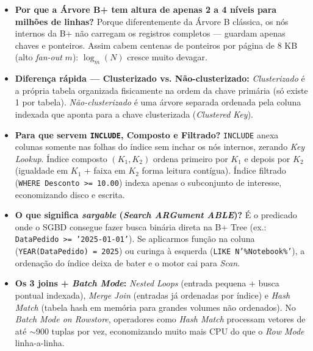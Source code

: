 \documentclass[10pt,a4paper]{article}
\begin{document}
\begin{expBox}
  \begin{itemize}[leftmargin=14pt,itemsep=2pt,topsep=1pt]
    \item \textbf{Por que a Árvore B+ tem altura de apenas 2 a 4 níveis para milhões de linhas?} Porque diferentemente da Árvore B clássica, os nós internos da B+ não carregam os registros completos — guardam apenas chaves e ponteiros. Assim cabem centenas de ponteiros por página de 8 KB (alto \emph{fan-out} $m$): $\log_m(N)$ cresce muito devagar.
    \item \textbf{Diferença rápida — Clusterizado vs. Não-clusterizado:}
      \emph{Clusterizado} é a própria tabela organizada fisicamente na ordem da chave primária (só existe 1 por tabela). \emph{Não-clusterizado} é uma árvore separada ordenada pela coluna indexada que aponta para a chave clusterizada (\emph{Clustered Key}).
    \item \textbf{Para que servem \texttt{INCLUDE}, Composto e Filtrado?}
      \texttt{INCLUDE} anexa colunas somente nas folhas do índice sem inchar os nós internos, zerando \emph{Key Lookup}. Índice composto $(K_1, K_2)$ ordena primeiro por $K_1$ e depois por $K_2$ (igualdade em $K_1$ + faixa em $K_2$ forma leitura contígua). Índice filtrado (\texttt{WHERE Desconto >= 10.00}) indexa apenas o subconjunto de interesse, economizando disco e escrita.
    \item \textbf{O que significa \emph{sargable} (\emph{Search ARGument ABLE})?} É o predicado onde o SGBD consegue fazer busca binária direta na B+ Tree (ex.: \texttt{DataPedido >= '2025-01-01'}). Se aplicarmos função na coluna (\texttt{YEAR(DataPedido) = 2025}) ou curinga à esquerda (\texttt{LIKE N'\%Notebook\%'}), a ordenação do índice deixa de bater e o motor cai para \emph{Scan}.
    \item \textbf{Os 3 joins + \emph{Batch Mode}:} \emph{Nested Loops} (entrada pequena + busca pontual indexada), \emph{Merge Join} (entradas já ordenadas por índice) e \emph{Hash Match} (tabela hash em memória para grandes volumes não ordenados). No \emph{Batch Mode on Rowstore}, operadores como \emph{Hash Match} processam vetores de até $\sim$900 tuplas por vez, economizando muito mais CPU do que o \emph{Row Mode} linha-a-linha.
  \end{itemize}
\end{expBox}
\end{document}
